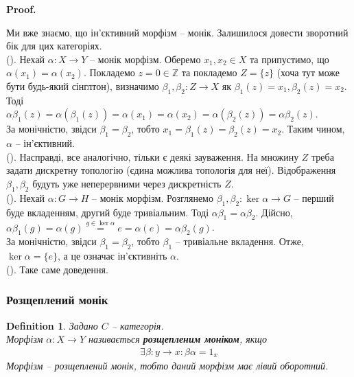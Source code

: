 \documentclass[a4paper, 10pt]{article}
\makeatletter
\theoremstyle{theoremdd}
\newtheorem{definition}[theorem]{Definition}
\renewenvironment{proof}[1][Proof.\\]{\par
\pushQED{\hfill \qed}%
\normalfont \topsep6\p@\@plus6\p@\relax
\trivlist
\item\relax
{\bfseries
#1\@addpunct{.}}\hspace\labelsep\ignorespaces
}{%
\popQED\endtrivlist\@endpefalse
}
\makeatother
\begin{document}
\begin{proof}
Ми вже знаємо, що ін'єктивний морфізм -- монік. Залишилося довести зворотний бік для цих категоріях.
\bigskip \\
(). Нехай $\alpha \colon X \to Y$ -- монік морфізм. Оберемо $x_1,x_2 \in X$ та припустимо, що $\alpha(x_1) = \alpha(x_2)$. Покладемо $z = 0 \in \mathbb{Z}$ та покладемо $Z = \{z\}$ (хоча тут може бути будь-який сінглтон), визначимо $\beta_1, \beta_2 \colon Z \to X$ як $\beta_1(z) = x_1, \beta_2(z) = x_2$. Тоді\\
$\alpha \beta_1(z) = \alpha(\beta_1(z)) = \alpha(x_1) = \alpha(x_2) = \alpha(\beta_2(z)) = \alpha \beta_2(z)$.\\
За монічністю, звідси $\beta_1 = \beta_2$, тобто $x_1 = \beta_1(z) = \beta_2(z) = x_2$. Таким чином, $\alpha$ -- ін'єктивний.
\bigskip \\
(). Насправді, все аналогічно, тільки є деякі зауваження. На множину $Z$ треба задати дискретну топологію (єдина можлива топологія для неї). Відображення $\beta_1,\beta_2$ будуть уже неперервними через дискретність $Z$.
\bigskip \\
(). Нехай $\alpha \colon G \to H$ -- монік морфізм. Розглянемо $\beta_1, \beta_2 \colon \ker \alpha \to G$ -- перший буде вкладенням, другий буде тривіальним. Тоді $\alpha \beta_1 = \alpha \beta_2$. Дійсно,\\
$\alpha \beta_1(g) = \alpha (g) \overset{g \in \ker \alpha}{=} e = \alpha(e) = \alpha \beta_2(g)$.\\
За монічністю, звідси $\beta_1 = \beta_2$, тобто $\beta_1$ -- тривіальне вкладення. Отже, $\ker \alpha = \{e\}$, а це означає ін'єктивніть $\alpha$.
\bigskip \\
(). Таке саме доведення.
\end{proof}

\subsubsection{Розщеплений монік}
\begin{definition}
Задано $C$ -- категорія.\\
Морфізм $\alpha \colon X \to Y$ називається \textbf{розщепленим моніком}, якщо
\begin{align*}
\exists \beta \colon y \to x: \beta \alpha = 1_x
\end{align*}
Морфізм -- розщеплений монік, тобто даний морфізм має лівий оборотний.
\begin{figure}[H]
\centering
{}
\end{figure}
\end{definition}
\end{document}
